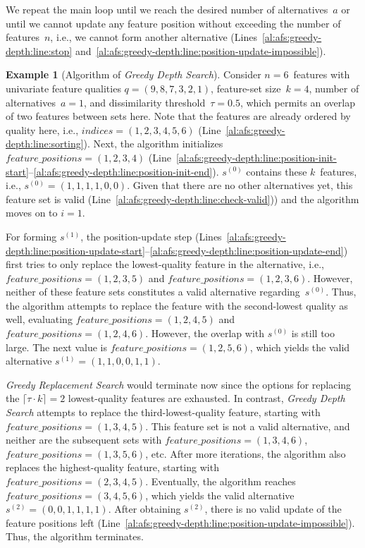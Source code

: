 \documentclass{article}
\theoremstyle{definition}
\newtheorem{example}{Example}
\begin{document}
We repeat the main loop until we reach the desired number of alternatives~$a$ or until we cannot update any feature position without exceeding the number of features~$n$, i.e., we cannot form another alternative (Lines~\ref{al:afs:greedy-depth:line:stop} and~\ref{al:afs:greedy-depth:line:position-update-impossible}).
%
\begin{example}[Algorithm of \emph{Greedy Depth Search}]
	Consider $n=6$~features with univariate feature qualities $q = (9,8,7,3,2,1)$, feature-set size~$k=4$, number of alternatives~$a=1$, and dissimilarity threshold~$\tau = 0.5$, which permits an overlap of two features between sets here.
	Note that the features are already ordered by quality here, i.e., $indices = (1,2,3,4,5,6)$ (Line~\ref{al:afs:greedy-depth:line:sorting}).
	Next, the algorithm initializes $feature\_positions = (1,2,3,4)$ (Line~\ref{al:afs:greedy-depth:line:position-init-start}--\ref{al:afs:greedy-depth:line:position-init-end}).
	$s^{(0)}$ contains these $k$~features, i.e., $s^{(0)} = (1,1,1,1,0,0)$.
	Given that there are no other alternatives yet, this feature set is valid (Line~\ref{al:afs:greedy-depth:line:check-valid})) and the algorithm moves on to $i=1$.
	
	For forming $s^{(1)}$, the position-update step (Lines~\ref{al:afs:greedy-depth:line:position-update-start}--\ref{al:afs:greedy-depth:line:position-update-end}) first tries to only replace the lowest-quality feature in the alternative, i.e., $feature\_positions = (1,2,3,5)$ and $feature\_positions = (1,2,3,6)$.
	However, neither of these feature sets constitutes a valid alternative regarding~$s^{(0)}$.
	Thus, the algorithm attempts to replace the feature with the second-lowest quality as well, evaluating $feature\_positions = (1,2,4,5)$ and $feature\_positions = (1,2,4,6)$.
	However, the overlap with $s^{(0)}$ is still too large.
	The next value is $feature\_positions = (1,2,5,6)$, which yields the valid alternative $s^{(1)} = (1,1,0,0,1,1)$.
	
	\emph{Greedy Replacement Search} would terminate now since the options for replacing the $\lceil \tau \cdot k \rceil = 2$ lowest-quality features are exhausted.
	In contrast, \emph{Greedy Depth Search} attempts to replace the third-lowest-quality feature, starting with $feature\_positions = (1,3,4,5)$.
	This feature set is not a valid alternative, and neither are the subsequent sets with $feature\_positions = (1,3,4,6)$, $feature\_positions = (1,3,5,6)$, etc.
	After more iterations, the algorithm also replaces the highest-quality feature, starting with $feature\_positions = (2,3,4,5)$.
	Eventually, the algorithm reaches $feature\_positions = (3,4,5,6)$, which yields the valid alternative $s^{(2)} = (0,0,1,1,1,1)$.
	After obtaining $s^{(2)}$, there is no valid update of the feature positions left (Line~\ref{al:afs:greedy-depth:line:position-update-impossible}).
	Thus, the algorithm terminates.
	\label{ex:afs:greedy-depth:algorithm}
\end{example}
\end{document}
